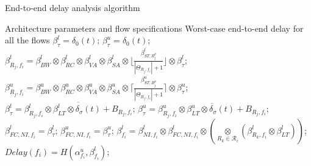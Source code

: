 \documentclass[10pt,journal]{IEEEtran}
\begin{document}
\begin{algorithm}
\caption{End-to-end delay analysis algorithm}
\label{alg:equivalentservicecurve}
\begin{algorithmic}[1]
\Require Architecture parameters and flow specifications
\Ensure Worst-case end-to-end delay for all the flows
        \State $\beta_{\tau}^l=\delta_0(t)$; $\beta_{\tau}^u=\delta_0(t)$;
            \State $\beta_{R_j,f_i}^l=\beta_{BW}^l\otimes\beta_{RC}^l\otimes\beta_{VA}^l\otimes\beta_{SA}^l\otimes\lfloor\frac{\beta_{ST,R_j^{p}}^{l^\prime}}{|\Theta_{R_j,f_i}|+1}\rfloor\otimes\beta_{\tau}^l$;
            \State $\beta_{R_j,f_i}^u=\beta_{BW}^u\otimes\beta_{RC}^u\otimes\beta_{VA}^u\otimes\beta_{SA}^u\otimes\lceil\frac{\beta_{ST,R_j^{p}}^{u^\prime}}{|\Theta_{R_j,f_i}|+1}\rceil\otimes\beta_{\tau}^u$;
            \State $\beta_{\tau}^l=\overline{\beta^l_{R_j,f_i}\otimes\beta_{LT}^l\otimes\delta_\sigma(t)+B_{R_j,f_i}}$;
            \State $\beta_{\tau}^u=\overline{\beta^u_{R_j,f_i}\otimes\beta_{LT}^u\otimes\delta_\sigma(t)+B_{R_j,f_i}}$;
        \EndFor
        \State $\beta_{FC,NI,f_i}^l=\beta^l_{\tau}$; $\beta_{FC,NI,f_i}^u=\beta^u_{\tau}$;
        \State $\beta_{f_i}^l=\beta_{NI,f_i}^l\otimes\beta_{FC,NI,f_i}^l\otimes (\underset{R_k\in\mathcal{R}_{i}}{\otimes}(\beta^l_{R_k,f_i}\otimes\beta^l_{LT}))$;
        \State $Delay(f_i)=H(\alpha^u_{f_i},\beta_{f_i}^l)$;
    \EndFor
\end{algorithmic}
\end{algorithm}
\end{document}
